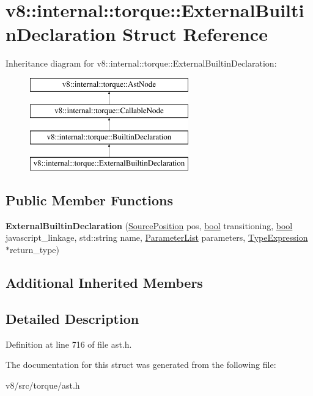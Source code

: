 \hypertarget{structv8_1_1internal_1_1torque_1_1ExternalBuiltinDeclaration}{}\section{v8\+:\+:internal\+:\+:torque\+:\+:External\+Builtin\+Declaration Struct Reference}
\label{structv8_1_1internal_1_1torque_1_1ExternalBuiltinDeclaration}
Inheritance diagram for v8\+:\+:internal\+:\+:torque\+:\+:External\+Builtin\+Declaration\+:\begin{figure}[H]
\begin{center}
\leavevmode
\includegraphics[height=4.000000cm]{structv8_1_1internal_1_1torque_1_1ExternalBuiltinDeclaration}
\end{center}
\end{figure}
\subsection*{Public Member Functions}
\begin{DoxyCompactItemize}
\item 
\mbox{\label{structv8_1_1internal_1_1torque_1_1ExternalBuiltinDeclaration_ab3815daf826409826a504d562a935aad}} 
{\bfseries External\+Builtin\+Declaration} (\mbox{\hyperlink{structv8_1_1internal_1_1torque_1_1SourcePosition}{Source\+Position}} pos, \mbox{\hyperlink{classbool}{bool}} transitioning, \mbox{\hyperlink{classbool}{bool}} javascript\+\_\+linkage, std\+::string name, \mbox{\hyperlink{structv8_1_1internal_1_1torque_1_1ParameterList}{Parameter\+List}} parameters, \mbox{\hyperlink{structv8_1_1internal_1_1torque_1_1TypeExpression}{Type\+Expression}} $\ast$return\+\_\+type)
\end{DoxyCompactItemize}
\subsection*{Additional Inherited Members}


\subsection{Detailed Description}


Definition at line 716 of file ast.\+h.



The documentation for this struct was generated from the following file\+:\begin{DoxyCompactItemize}
\item 
v8/src/torque/ast.\+h\end{DoxyCompactItemize}
